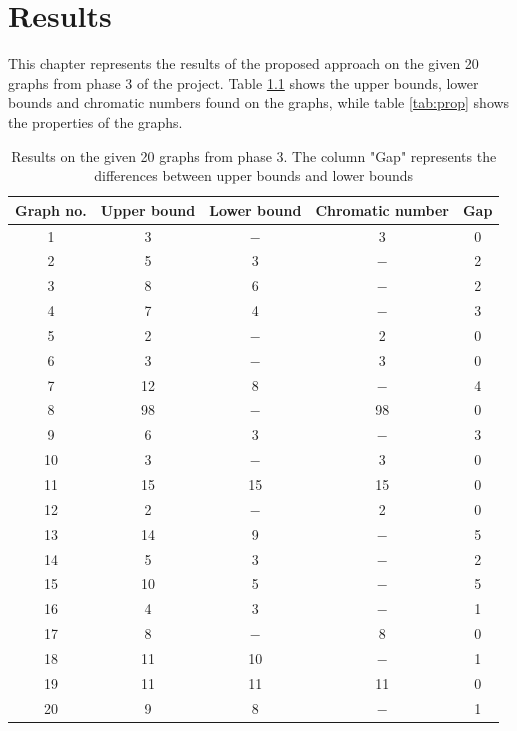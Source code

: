 \documentclass[a4paper]{report}
\begin{document}
	\chapter{Results}
	This chapter represents the results of the proposed approach on the given 20 graphs from phase 3 of the project. Table \ref{tab:result} shows the upper bounds, lower bounds and chromatic numbers found on the graphs, while table \ref{tab:prop} shows the properties of the graphs.
		\begin{table} [h!]
			\caption{Results on the given 20 graphs from phase 3. The column "Gap" represents the differences between upper bounds and lower bounds}
		\begin{center}
			\begin{tabular}{| c | c | c | c |c|}
				\hline
				Graph no. & Upper bound & Lower bound & Chromatic number & Gap \\
				\hline
				1 & 3 & $-$ & 3 & 0\\
				\hline
				2 & 5 & 3 & $-$ & 2\\
				\hline
				3 & 8 & 6 & $-$ & 2\\
				\hline
				4 & 7 & 4 & $-$ & 3\\
				\hline
				5 & 2 & $-$ & 2 & 0\\
				\hline
				6 & 3 & $-$ & 3 & 0\\
				\hline
				7 & 12 & 8 & $-$ & 4\\
				\hline
				8 & 98 & $-$ & 98 & 0\\
				\hline
				9 & 6 & 3 & $-$ & 3\\
				\hline
				10 & 3 & $-$ & 3 & 0\\
				\hline
				11 & 15 & 15 & 15 & 0\\
				\hline
				12 & 2 & $-$ & 2 & 0\\
				\hline
				13 & 14 & 9 & $-$ & 5\\
				\hline
				14 & 5 & 3 & $-$ & 2\\
				\hline
				15 & 10 & 5 & $-$ & 5\\
				\hline
				16 & 4 & 3 & $-$ & 1\\
				\hline
				17 & 8 & $-$ & 8 & 0\\
				\hline
				18 & 11 & 10 & $-$ & 1\\
				\hline
				19 & 11 & 11 & 11 & 0\\
				\hline
				20 & 9 & 8 & $-$ & 1\\
				\hline
			\end{tabular}
		\end{center}
		\label{tab:result}
	\end{table}
	
\end{document}
